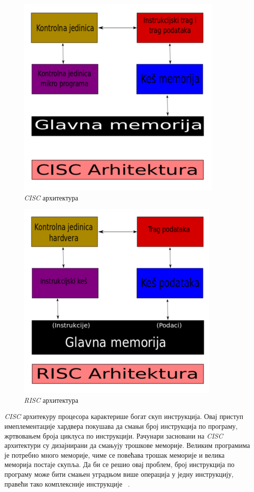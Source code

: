 \documentclass[12pt,oneside]{memoir}
\begin{document}
\begin{figure}[h!]
\begin{center}
\includegraphics[scale=0.75]{cisc.png}
\end{center}
\caption{\textit{CISC} архитектура}
\label{fig:main}
\end{figure}

\begin{figure}[h!]
\begin{center}
\includegraphics[scale=0.75]{risc.png}
\end{center}
\caption{\textit{RISC} архитектура}
\label{fig:main}
\end{figure}

\indent \textit{CISC} архитекуру процесора карактерише богат скуп инструкција. Овај приступ имеплементације хардвера покушава да смањи број инструкција по програму, жртвовањем броја циклуса по инструкцији. Рачунари засновани на \textit{CISC} архитектури су дизајнирани да смањују трошкове меморије. Великим програмима је потребно много меморије, чиме се повећава трошак меморије и велика меморија постаје скупља. Да би се решио овај проблем, број инструкција по програму може бити смањен уградњом више операција у једну инструкцију, правећи тако комплексније инструкције ~\cite{rcRef}.
\end{document}
